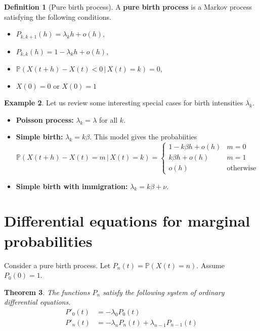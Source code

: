 \documentclass[10pt, oneside, reqno]{amsart}
\theoremstyle{plain}%
\newtheorem{thm}{Theorem}[section]
\theoremstyle{definition}
\newtheorem{defn}[thm]{Definition}
\newtheorem{exmp}[thm]{Example}
\theoremstyle{remark}
\newcommand{\prob}[1]{\mathbb{P}(#1)}
\newcommand{\given}{ \, | \,}
\begin{document}
\begin{defn}[Pure birth process]
    A \textbf{pure birth process} is a Markov process satisfying the following conditions.
    \begin{itemize}
        \item $P_{k,k+1}(h) = \lambda_k h + o(h)$,
        \item $P_{k,k}(h) = 1 - \lambda_k h + o(h)$,
        \item $\prob{X(t+h) - X(t) < 0 \given X(t) = k} = 0$,
        \item $X(0) = 0$ or $X(0) = 1$
    \end{itemize}
\end{defn}

\begin{exmp}
    Let us review some interesting special cases for birth intensities $\lambda_k$.
    
    \begin{itemize}
        \item \textbf{Poisson process:} $\lambda_k = \lambda$ for all $k$.
        \item \textbf{Simple birth:} $\lambda_k = k \beta$.  This model gives the probabiities \[
            \prob{X(t+h) - X(t) = m \given X(t) =k} = \begin{cases}
                1 - k\beta h + o(h) & m = 0 \\
                k\beta h + o(h) &m=1\\
                o(h) &\text{otherwise}
            \end{cases}
        \]
        \item \textbf{Simple birth with immigration:} $\lambda_k = k \beta + \nu$.  
    \end{itemize}
\end{exmp}


\section{Differential equations for marginal probabilities} %
\label{sub:differential_equations_for_marginal_probabilities}

Consider a pure birth process.  Let $P_n(t) = \prob{X(t) = n}$.  Assume $P_0(0) = 1$.
\begin{thm}
    The functions $P_n$ satisfy the following system of ordinary differential equations.
    \begin{align*}
        P'_0(t) &= -\lambda_0 P_0(t) \\
        P'_n(t) &= -\lambda_n P_n(t) + \lambda_{n-1} P_{n-1}(t)
    \end{align*}
\end{thm}
\end{document}
